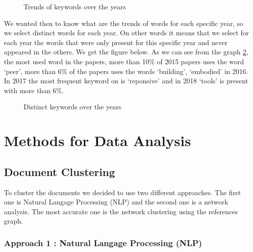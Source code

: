 \documentclass[article,twocolumn]{IEEEtran}
\begin{document}
    \begin{figure}
        \begin{center}\end{center}
        \caption{Trends of keywords over the years}
        \label{fig1}
    \end{figure}
    
    We wanted then to know what are the trends of words for each specific
year, so we select distinct words for each year. On other words it means
that we select for each year the words that were only present for this
specific year and never appeared in the others. We get the figure below.
As we can see from the graph \ref{fig2}, the most used word in the
papers, more than 10\% of 2015 papers uses the word `peer', more than
6\% of the papers uses the words `building', `embodied' in 2016. In 2017
the most frequent keyword on is `reponsive' and in 2018 `tools' is
present with more than 6\%.


    \begin{figure}
        \begin{center}\end{center}
        \caption{Distinct keywords over the years}
        \label{fig2}
    \end{figure}
    
    \hypertarget{methods-for-data-analysis}{%
\section{Methods for Data Analysis}\label{methods-for-data-analysis}}

    \hypertarget{document-clustering}{%
\subsection{Document Clustering}\label{document-clustering}}

To cluster the documents we decided to use two different approaches. The
first one is Natural Langage Processing (NLP) and the second one is a
network analysis. The most accurate one is the network clustering using
the references graph.

\hypertarget{approach-1-natural-langage-processing-nlp}{%
\subsubsection{Approach 1 : Natural Langage Processing
(NLP)}\label{approach-1-natural-langage-processing-nlp}}
\end{document}
